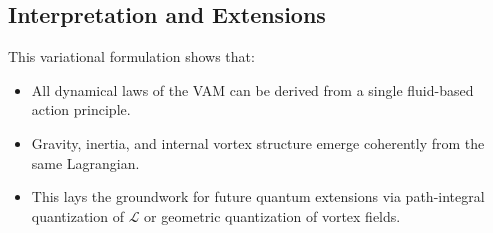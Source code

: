 \subsection*{Interpretation and Extensions}
This variational formulation shows that:
\begin{itemize}
    \item All dynamical laws of the VAM can be derived from a single fluid-based action principle.
    \item Gravity, inertia, and internal vortex structure emerge coherently from the same Lagrangian.
    \item This lays the groundwork for future quantum extensions via path-integral quantization of $\mathcal{L}$ or geometric quantization of vortex fields.
\end{itemize}
